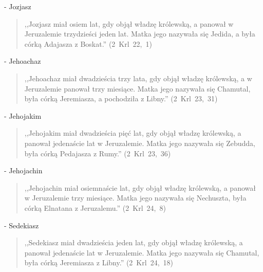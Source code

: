 \documentclass[10pt,a4paper,oneside]{article}
\begin{document}
- Jozjasz
\begin{quote}
,,Jozjasz miał osiem lat, gdy objął władzę królewską, a panował w Jeruzalemie trzydzieści jeden lat. Matka jego nazywała się Jedida, a była córką Adajasza z Boskat.'' (2~Krl~22,~1)
\end{quote}
- Jehoachaz
\begin{quote}
,,Jehoachaz miał dwadzieścia trzy lata, gdy objął władzę królewską, a w Jeruzalemie panował trzy miesiące. Matka jego nazywała się Chamutal, była córką Jeremiasza, a pochodziła z Libny.'' (2~Krl~23,~31)
\end{quote}
- Jehojakim
\begin{quote}
,,Jehojakim miał dwadzieścia pięć lat, gdy objął władzę królewską, a panował jedenaście lat w Jeruzalemie. Matka jego nazywała się Zebudda, była córką Pedajasza z Rumy.'' (2~Krl~23,~36)
\end{quote}
- Jehojachin
\begin{quote}
,,Jehojachin miał osiemnaście lat, gdy objął władzę królewską, a panował w Jeruzalemie trzy miesiące. Matka jego nazywała się Nechuszta, była córką Elnatana z Jeruzalemu.'' (2~Krl~24,~8)
\end{quote}
- Sedekiasz
\begin{quote}
,,Sedekiasz miał dwadzieścia jeden lat, gdy objął władzę królewską, a panował jedenaście lat w Jeruzalemie. Matka jego nazywała się Chamutal, była córką Jeremiasza z Libny.'' (2~Krl~24,~18)
\end{quote}
\end{document}
